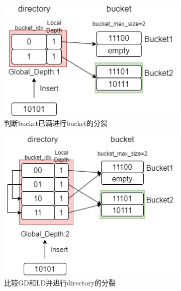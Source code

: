 \documentclass[a4paper]{article}
\begin{document}
\begin{figure}[h!]
   \centering
   \begin{minipage}[b]{0.4\linewidth}
     \centering
     \begin{subfigure}{}
       \includegraphics[width=\linewidth]{9.png}
       \caption{判断bucket已满进行bucket的分裂}
     \end{subfigure}
     \vfill
     \begin{subfigure}{}
       \includegraphics[width=\linewidth]{10.png}
       \caption{比较GD和LD并进行directory的分裂}
     \end{subfigure}
   \end{minipage}%
   \begin{minipage}[b]{0.4\linewidth}
     \centering
     \begin{subfigure}{}

\end{subfigure}
\end{minipage}
\end{figure}
\end{document}
